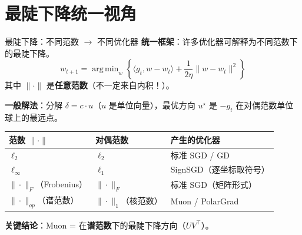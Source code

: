 \documentclass[aspectratio=169,10pt]{ctexbeamer}
\DeclareMathOperator*{\argmin}{arg\,min}
\begin{document}
\section{最陡下降统一视角}

\begin{frame}{最陡下降：不同范数 $\to$ 不同优化器}
\textbf{统一框架}：许多优化器可解释为不同范数下的最陡下降。
\[
  w_{t+1} = \argmin_w \left\{\langle g_t, w-w_t\rangle + \frac{1}{2\eta}\|w-w_t\|^2\right\}
\]
其中 $\|\cdot\|$ 是\textbf{任意范数}（不一定来自内积！）。

\vspace{0.2cm}
\textbf{一般解法}：分解 $\delta = c\cdot u$（$u$ 是单位向量），最优方向 $u^\star$ 是 $-g_t$ 在对偶范数单位球上的最远点。

\vspace{0.2cm}
\begin{center}
\begin{tabular}{lll}
\toprule
范数 $\|\cdot\|$ & 对偶范数 & 产生的优化器 \\
\midrule
$\ell_2$ & $\ell_2$ & 标准 SGD / GD \\
$\ell_\infty$ & $\ell_1$ & SignSGD（逐坐标取符号） \\
$\|\cdot\|_F$（Frobenius） & $\|\cdot\|_F$ & 标准 SGD（矩阵形式） \\
$\|\cdot\|_{op}$（谱范数） & $\|\cdot\|_1$（核范数） & Muon / PolarGrad \\
\bottomrule
\end{tabular}
\end{center}

\textbf{关键结论}：Muon = 在\textbf{谱范数}下的最陡下降方向（$UV^\top$）。
\end{frame}
\end{document}
